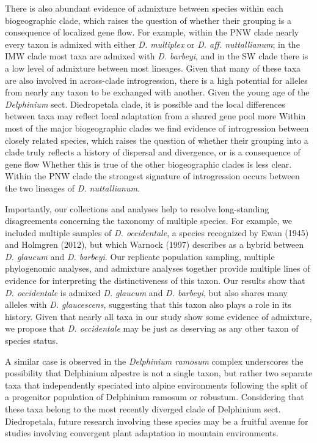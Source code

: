 \documentclass[11pt]{article}
\begin{document}
There is also abundant evidence of admixture between species within each 
biogeographic clade, which raises the question of whether their grouping 
is a consequence of localized gene flow.
% 
For example, within the PNW clade nearly every taxon is admixed
with either \emph{D. multiplex} or \emph{D. aff. nuttallianum}; 
in the IMW clade most taxa are admixed with \emph{D. barbeyi}, and in the 
SW clade there is a low level of admixture between most lineages. 
Given that many of these taxa are also involved in across-clade introgression, 
there is a high potential for alleles from nearly any taxon to be exchanged
with another.
% 
Given the young age of the \emph{Delphinium} sect. Diedropetala clade, it 
is possible and the local differences between taxa may reflect local 
adaptation from a shared gene pool more 
% 
Within most of the major biogeographic clades we find evidence of introgression
between closely related species, which raises the question of whether their 
grouping into a clade truly reflects a history of dispersal and divergence, or
is a consequence of gene flow 
% 
Whether this is true of the other biogeographic clades is less clear. 
% 
Within the PNW clade the strongest signature of introgression occurs between the
two lineages of \emph{D. nuttallianum}. 


Importantly, our collections and analyses help to resolve long-standing disagreements 
concerning the taxonomy of multiple species. For example, we included multiple samples
of \emph{D. occidentale}, a species recognized by Ewan (1945) and Holmgren (2012), 
but which Warnock (1997) describes as a hybrid between \emph{D. glaucum} and 
\emph{D. barbeyi}. 
% 
Our replicate population sampling, multiple phylogenomic analyses, and admixture 
analyses together provide multiple lines of evidence for interpreting the distinctiveness
of this taxon. Our results show that \emph{D. occidentale} is admixed \emph{D. glaucum} 
and \emph{D. barbeyi}, but also shares many alleles with \emph{D. glaucescens}, suggesting
that this taxon also plays a role in its history. Given that nearly all taxa in our 
study show some evidence of admixture, we propose that \emph{D. occidentale} 
may be just as deserving as any other taxon of species status.


A similar case is observed in the \emph{Delphinium ramosum} complex underscores the possibility that Delphinium alpestre is not a single taxon, but rather two separate taxa that independently speciated into alpine environments following the split of a progenitor population of Delphinium ramosum or robustum. Considering that these taxa belong to the most recently diverged clade of Delphinium sect. Diedropetala, future research involving these species may be a fruitful avenue for studies involving convergent plant adaptation in mountain environments.
\end{document}
